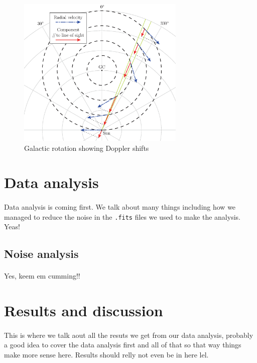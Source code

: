 \documentclass[a4paper, titlepage, oneside]{article}
\begin{document}
\begin{multicols}{2}
\begin{figure}[H]
  \centering
  \includegraphics[width = 8cm]{figures/galactic-rotation}
  \caption{Galactic rotation showing Doppler shifts}
  \label{fig:gal-rot}
\end{figure}

\section{Data analysis}
\paragraph{}
Data analysis is coming first. We talk about many things including how we managed to reduce the noise in the \texttt{.fits} files we used to make the analysis. Yeas!

\subsection{Noise analysis}
\paragraph{}
Yes, keem em cumming!!

\section{Results and discussion}
\paragraph{}
This is where we talk aout all the resuts we get from our data analysis, probably a good idea to cover the data analysis first and all of that so that way things make more sense here. Results should relly not even be in here lel.


\end{multicols}
\end{document}
